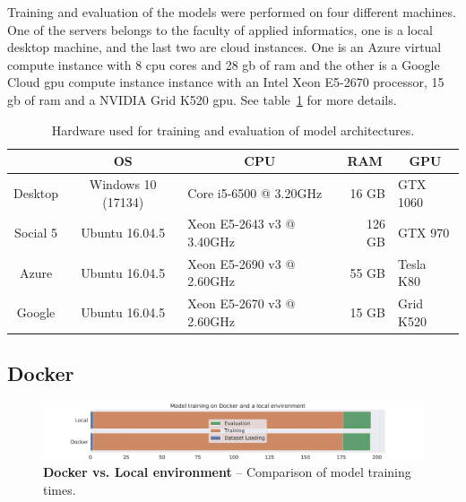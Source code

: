 Training and evaluation of the models were performed on four different machines. One of the servers belongs to the faculty of applied informatics, one is a local desktop machine, and the last two are cloud instances. One is an Azure virtual compute instance with 8 \gls{cpu} cores and 28 \gls{gb} of \gls{ram} and the other is a Google Cloud \gls{gpu} compute instance instance with an Intel Xeon E5-2670 processor, 15 \gls{gb} of \gls{ram} and a NVIDIA Grid K520 \gls{gpu}. See table~\ref{tab:05_usedHardware} for more details.
\begin{table}
    \centering
    \caption{Hardware used for training and evaluation of model architectures.}
    \begin{tabular}{@{}cclrl@{}}
        \toprule
        \multicolumn{1}{c}{\textbf{}}    & \multicolumn{1}{c}{\textbf{OS}} & \multicolumn{1}{c}{\textbf{CPU}}                    & \multicolumn{1}{c}{\textbf{RAM}} & \multicolumn{1}{c}{\textbf{GPU}}     \\ \midrule
        Desktop      & Windows 10 (17134)        & Core i5-6500 @ 3.20GHz     & 16 GB        & GTX 1060 \\
        Social 5     & Ubuntu 16.04.5            & Xeon E5-2643 v3 @ 3.40GHz  & 126 GB        & GTX 970 \\ 
        Azure        & Ubuntu 16.04.5            & Xeon E5-2690 v3 @ 2.60GHz  & 55 GB        & Tesla K80 \\ 
        Google        & Ubuntu 16.04.5            & Xeon E5-2670 v3 @ 2.60GHz  & 15 GB        & Grid K520 \\
        
        \bottomrule
    \end{tabular}
    \label{tab:05_usedHardware}
\end{table}


\subsection{Docker}
\begin{figure}[ht]
    \centering
    \includegraphics[width=\textwidth]{figures/05_setup/05_dockerExecution}
    \caption{\textbf{Docker vs. Local environment} -- Comparison of model training times.}
    \label{fig:05_dockerExecution}
\end{figure}


